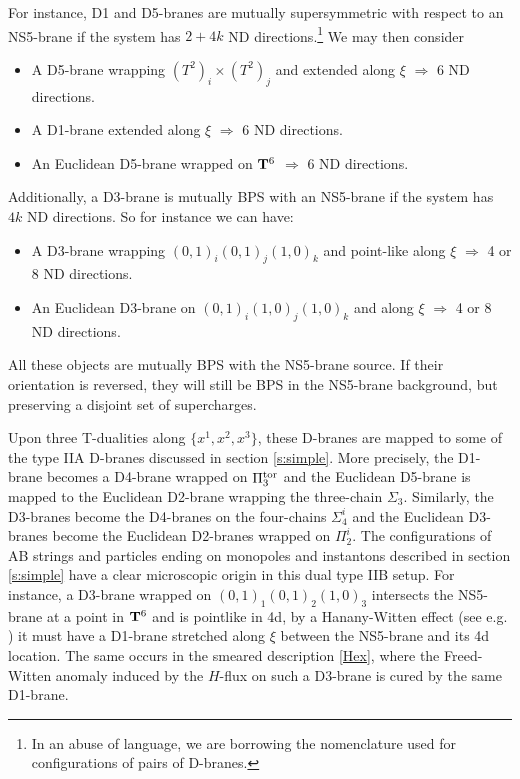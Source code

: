\documentclass[11pt]{article}
\begin{document}
For instance, D1 and D5-branes are mutually supersymmetric with respect to an NS5-brane if the system has $2+4k$ ND directions.\footnote{In an abuse of language, we are borrowing the nomenclature used for configurations of pairs of D-branes.} We may then consider

\begin{itemize}

\item[-] A D5-brane wrapping  $(T^2)_i \times (T^2)_j$ and extended along $\xi$  $\Longrightarrow$ 6 ND directions. 

\item[-] A D1-brane extended along $\xi$ $\Longrightarrow$ 6 ND directions. 

\item[-] An Euclidean D5-brane wrapped on ${\bf T}^6$ $\Longrightarrow$ 6 ND directions.

\end{itemize}
%
Additionally, a D3-brane is mutually BPS with an NS5-brane if the system has $4k$ ND directions. So for instance we can have:

\begin{itemize}

\item[-] A D3-brane wrapping  $(0,1)_i(0,1)_j(1,0)_k$ and point-like along $\xi$  $\Longrightarrow$ 4 or 8 ND directions. 

\item[-] An Euclidean D3-brane on  $(0,1)_i(1,0)_j(1,0)_k$ and along $\xi$  $\Longrightarrow$ 4 or 8 ND directions. 

\end{itemize}
%
All these objects are mutually BPS with the NS5-brane source. If their orientation is reversed, they will still be BPS in the NS5-brane background, but preserving a disjoint set of supercharges. 

Upon three T-dualities along $\{x^1, x^2, x^3\}$, these D-branes are mapped to some of the type IIA D-branes discussed in section \ref{s:simple}. More precisely,  the D1-brane becomes a D4-brane wrapped on $\Pi_3^{\rm tor}$ and the Euclidean D5-brane is mapped to the Euclidean D2-brane wrapping the three-chain $\Sigma_3$. Similarly, the D3-branes become the D4-branes on the four-chains $\Sigma_4^i$ and the Euclidean D3-branes become the Euclidean D2-branes wrapped on $\Pi_2^i$. The configurations of AB strings and particles ending on monopoles and instantons described in section \ref{s:simple} have a clear microscopic origin in this dual type IIB setup. For instance, a D3-brane wrapped on $(0,1)_1(0,1)_2(1,0)_3$ intersects the NS5-brane at a point in ${\bf T}^6$ and is pointlike in 4d, by a Hanany-Witten effect (see e.g. \cite[Appendix B]{Berasaluce-Gonzalez:2012awn}) it must have a D1-brane stretched along $\xi$ between the NS5-brane and its 4d location. The same occurs in the smeared description \eqref{Hex}, where the Freed-Witten anomaly induced by the $H$-flux on such a D3-brane is cured by the same D1-brane. 
\end{document}
